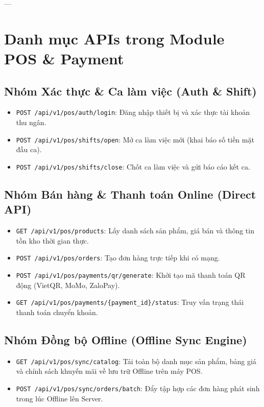 \documentclass[12pt,a4paper]{article}
\begin{document}
	---
	
	\section{Danh mục APIs trong Module POS \& Payment}
	
	\subsection{Nhóm Xác thực \& Ca làm việc (Auth \& Shift)}
	\begin{itemize}
		\item \texttt{POST /api/v1/pos/auth/login}: Đăng nhập thiết bị và xác thực tài khoản thu ngân.
		\item \texttt{POST /api/v1/pos/shifts/open}: Mở ca làm việc mới (khai báo số tiền mặt đầu ca).
		\item \texttt{POST /api/v1/pos/shifts/close}: Chốt ca làm việc và gửi báo cáo kết ca.
	\end{itemize}
	
	\subsection{Nhóm Bán hàng \& Thanh toán Online (Direct API)}
	\begin{itemize}
		\item \texttt{GET /api/v1/pos/products}: Lấy danh sách sản phẩm, giá bán và thông tin tồn kho thời gian thực.
		\item \texttt{POST /api/v1/pos/orders}: Tạo đơn hàng trực tiếp khi có mạng.
		\item \texttt{POST /api/v1/pos/payments/qr/generate}: Khởi tạo mã thanh toán QR động (VietQR, MoMo, ZaloPay).
		\item \texttt{GET /api/v1/pos/payments/\{payment\_id\}/status}: Truy vấn trạng thái thanh toán chuyển khoản.
	\end{itemize}
	
	\subsection{Nhóm Đồng bộ Offline (Offline Sync Engine)}
	\begin{itemize}
		\item \texttt{GET /api/v1/pos/sync/catalog}: Tải toàn bộ danh mục sản phẩm, bảng giá và chính sách khuyến mãi về lưu trữ Offline trên máy POS.
		\item \texttt{POST /api/v1/pos/sync/orders/batch}: Đẩy tập hợp các đơn hàng phát sinh trong lúc Offline lên Server.
	\end{itemize}
	
\end{document}
